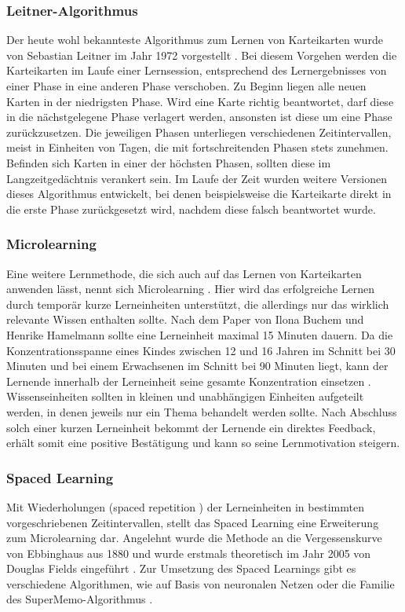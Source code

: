 \subsubsection{Leitner-Algorithmus}
Der heute wohl bekannteste Algorithmus zum Lernen von Karteikarten wurde von Sebastian Leitner im Jahr 1972 vorgestellt \cite{SebastianLeitner.1972}. Bei diesem Vorgehen werden die Karteikarten im Laufe einer Lernsession, entsprechend des Lernergebnisses von einer Phase in eine anderen Phase verschoben. Zu Beginn liegen alle neuen Karten in der niedrigsten Phase. Wird eine Karte richtig beantwortet, darf diese in die nächstgelegene Phase verlagert werden, ansonsten ist diese um eine Phase zurückzusetzen. Die jeweiligen Phasen unterliegen verschiedenen Zeitintervallen, meist in Einheiten von Tagen, die mit fortschreitenden Phasen stets zunehmen. Befinden sich Karten in einer der höchsten Phasen, sollten diese im Langzeitgedächtnis verankert sein. Im  Laufe der Zeit wurden weitere Versionen dieses Algorithmus entwickelt, bei denen beispielsweise die Karteikarte direkt in die erste Phase zurückgesetzt wird, nachdem diese falsch beantwortet wurde.

\subsubsection{Microlearning}
Eine weitere Lernmethode, die sich auch auf das Lernen von Karteikarten anwenden lässt, nennt sich Microlearning \cite{Hug.2005}. Hier wird das erfolgreiche Lernen durch temporär kurze Lerneinheiten unterstützt, die allerdings nur das wirklich relevante Wissen enthalten sollte. Nach dem Paper von Ilona Buchem und Henrike Hamelmann \cite{Buchem.2010} sollte eine Lerneinheit maximal 15 Minuten dauern. Da die Konzentrationsspanne eines Kindes zwischen 12 und 16 Jahren im Schnitt bei 30 Minuten und bei einem Erwachsenen im Schnitt bei 90 Minuten liegt, kann der Lernende innerhalb der Lerneinheit seine gesamte Konzentration einsetzen \cite{konzentrationsspanne}. Wissenseinheiten sollten in kleinen und unabhängigen Einheiten aufgeteilt werden, in denen jeweils nur ein Thema behandelt werden sollte. Nach Abschluss solch einer kurzen Lerneinheit bekommt der Lernende ein direktes Feedback, erhält somit eine positive Bestätigung und kann so seine Lernmotivation steigern.


\subsubsection{Spaced Learning}
Mit Wiederholungen (\glqq spaced repetition \grqq{}) der Lerneinheiten in bestimmten vorgeschriebenen Zeitintervallen, stellt das Spaced Learning eine Erweiterung zum Microlearning dar. Angelehnt wurde die Methode an die Vergessenskurve von Ebbinghaus aus 1880 und wurde erstmals theoretisch im Jahr 2005 von Douglas Fields eingeführt \cite{Fields.2005}. Zur Umsetzung des Spaced Learnings gibt es verschiedene Algorithmen, wie auf Basis von neuronalen Netzen \cite{BartoszDregerPiotrWozniak.1998} oder die Familie des SuperMemo-Algorithmus \cite{supermemo}. 


